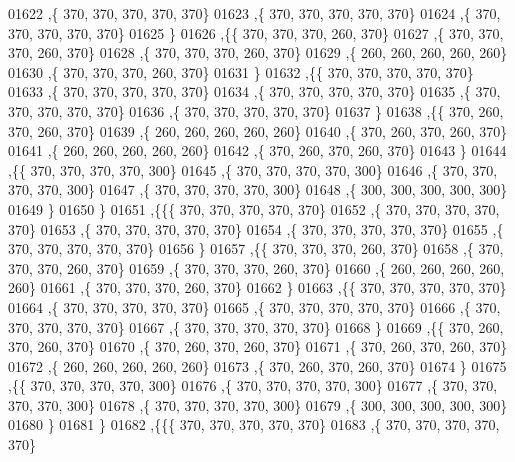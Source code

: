\begin{DoxyCode}
01622    ,\{   370,   370,   370,   370,   370\}
01623    ,\{   370,   370,   370,   370,   370\}
01624    ,\{   370,   370,   370,   370,   370\}
01625    \}
01626   ,\{\{   370,   370,   370,   260,   370\}
01627    ,\{   370,   370,   370,   260,   370\}
01628    ,\{   370,   370,   370,   260,   370\}
01629    ,\{   260,   260,   260,   260,   260\}
01630    ,\{   370,   370,   370,   260,   370\}
01631    \}
01632   ,\{\{   370,   370,   370,   370,   370\}
01633    ,\{   370,   370,   370,   370,   370\}
01634    ,\{   370,   370,   370,   370,   370\}
01635    ,\{   370,   370,   370,   370,   370\}
01636    ,\{   370,   370,   370,   370,   370\}
01637    \}
01638   ,\{\{   370,   260,   370,   260,   370\}
01639    ,\{   260,   260,   260,   260,   260\}
01640    ,\{   370,   260,   370,   260,   370\}
01641    ,\{   260,   260,   260,   260,   260\}
01642    ,\{   370,   260,   370,   260,   370\}
01643    \}
01644   ,\{\{   370,   370,   370,   370,   300\}
01645    ,\{   370,   370,   370,   370,   300\}
01646    ,\{   370,   370,   370,   370,   300\}
01647    ,\{   370,   370,   370,   370,   300\}
01648    ,\{   300,   300,   300,   300,   300\}
01649    \}
01650   \}
01651  ,\{\{\{   370,   370,   370,   370,   370\}
01652    ,\{   370,   370,   370,   370,   370\}
01653    ,\{   370,   370,   370,   370,   370\}
01654    ,\{   370,   370,   370,   370,   370\}
01655    ,\{   370,   370,   370,   370,   370\}
01656    \}
01657   ,\{\{   370,   370,   370,   260,   370\}
01658    ,\{   370,   370,   370,   260,   370\}
01659    ,\{   370,   370,   370,   260,   370\}
01660    ,\{   260,   260,   260,   260,   260\}
01661    ,\{   370,   370,   370,   260,   370\}
01662    \}
01663   ,\{\{   370,   370,   370,   370,   370\}
01664    ,\{   370,   370,   370,   370,   370\}
01665    ,\{   370,   370,   370,   370,   370\}
01666    ,\{   370,   370,   370,   370,   370\}
01667    ,\{   370,   370,   370,   370,   370\}
01668    \}
01669   ,\{\{   370,   260,   370,   260,   370\}
01670    ,\{   370,   260,   370,   260,   370\}
01671    ,\{   370,   260,   370,   260,   370\}
01672    ,\{   260,   260,   260,   260,   260\}
01673    ,\{   370,   260,   370,   260,   370\}
01674    \}
01675   ,\{\{   370,   370,   370,   370,   300\}
01676    ,\{   370,   370,   370,   370,   300\}
01677    ,\{   370,   370,   370,   370,   300\}
01678    ,\{   370,   370,   370,   370,   300\}
01679    ,\{   300,   300,   300,   300,   300\}
01680    \}
01681   \}
01682  ,\{\{\{   370,   370,   370,   370,   370\}
01683    ,\{   370,   370,   370,   370,   370\}

\end{DoxyCode}
